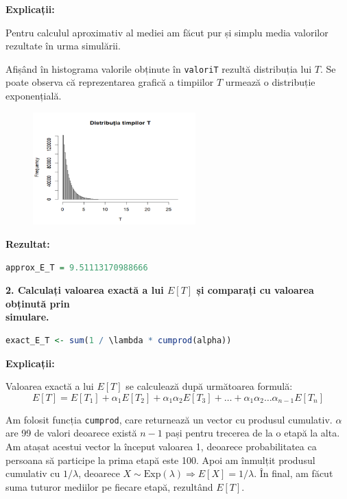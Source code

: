 \documentclass[a4paper,11pt]{article}
\begin{document}
\textbf{Explicații:}

Pentru calculul aproximativ al mediei am făcut pur și simplu media valorilor rezultate în urma simulării.

Afișând în histograma valorile obținute în \texttt{valoriT} rezultă distribuția lui $T$. Se poate observa că reprezentarea grafică a timpiilor $T$ urmează o distribuție exponențială.

\begin{figure}[h!]
    \centering
    \includegraphics[width=0.56\textwidth]{./img/1.png} %
    \label{fig:imaginea_ta}
\end{figure}

\newpage
\textbf{Rezultat:}
\begin{lstlisting}[language=R]
approx_E_T = 9.51113170988666
\end{lstlisting}

\textbf{2. Calculați valoarea exactă a lui $E[T]$ și comparați cu valoarea obținută prin \\simulare.}
\begin{lstlisting}[language=R]
exact_E_T <- sum(1 / \lambda * cumprod(alpha))
\end{lstlisting}

\textbf{Explicații:} 

Valoarea exactă a lui \( E[T] \) se calculează după următoarea formulă:
\[
E[T] = E[T_1] + \alpha_1 E[T_2] + \alpha_1 \alpha_2 E[T_3] + \ldots + \alpha_1 \alpha_2 \ldots \alpha_{n-1} E[T_n]
\]

Am folosit funcția \texttt{cumprod}, care returnează un vector cu produsul cumulativ. \(\alpha\) are 99 de valori deoarece există \( n-1 \) pași pentru trecerea de la o etapă la alta. Am atașat acestui vector la început valoarea 1, deoarece probabilitatea ca persoana să participe la prima etapă este 100. Apoi am înmulțit produsul cumulativ cu \( 1/\lambda \), deoarece \( X \sim \text{Exp}(\lambda) \Rightarrow E[X] = 1/\lambda \). În final, am făcut suma tuturor mediilor pe fiecare etapă, rezultând \( E[T] \).
\end{document}
